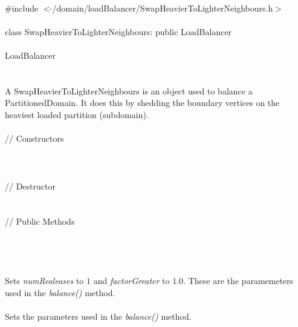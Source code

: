 
   \\
\indent \#include $<\tilde{ }$/domain/loadBalancer/SwapHeavierToLighterNeighbours.h$>$  \\

  \\
\indent class SwapHeavierToLighterNeighbours: public LoadBalancer \\

 \\
\indent  LoadBalancer \\
\indent{} \\


  \\
\indent A SwapHeavierToLighterNeighbours is an object used to balance a
PartitionedDomain. It does this by shedding the boundary vertices on
the heaviest loaded partition (subdomain). \\

  \\
\indent\indent  // Constructors  \\
\indent{}\\ 
\indent{} \\ \\
\indent\indent // Destructor  \\
\indent{}  \\ \\
\indent\indent // Public Methods  \\
\indent{} \\ \\


\\
\\ 
Sets {\em numRealeases} to $1$ and {\em factorGreater} to $1.0$. These
are the paramemeters used in the {\em balance()} method. \\

\\ 
Sets the parameters used in the {\em balance()} method. \\


